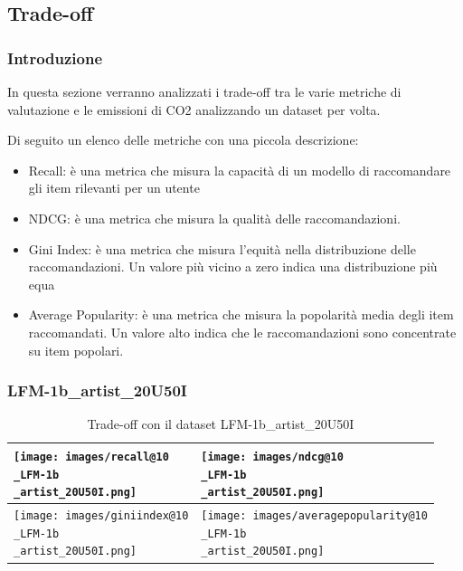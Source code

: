 \subsection{Trade-off}


\subsubsection{Introduzione}
In questa sezione verranno analizzati i trade-off tra le varie metriche di valutazione e le emissioni di CO2 analizzando un dataset per volta.

Di seguito un elenco delle metriche con una piccola descrizione:
\begin{itemize}
    \item Recall: è una metrica che misura la capacità di un modello di raccomandare gli item rilevanti per un utente
    \item NDCG: è una metrica che misura la qualità delle raccomandazioni.
    \item Gini Index: è una metrica che misura l'equità nella distribuzione delle raccomandazioni. Un valore più vicino a zero indica una distribuzione più equa
    \item Average Popularity: è una metrica che misura la popolarità media degli item raccomandati. Un valore alto indica che le raccomandazioni sono concentrate su item popolari.
\end{itemize}

\subsubsection{LFM-1b\_artist\_20U50I}


\begin{table}[H]
    \centering
    \footnotesize
    \setlength\tabcolsep{0pt}
    \begin{tabularx}{\textwidth}{|X|X|}
        \hline
        \texttt{[image: images/recall@10\\\_LFM-1b\\\_artist\_20U50I.png]} &
        \texttt{[image: images/ndcg@10\\\_LFM-1b\\\_artist\_20U50I.png]} \\
        \hline
        \texttt{[image: images/giniindex@10\\\_LFM-1b\\\_artist\_20U50I.png]} &
        \texttt{[image: images/averagepopularity@10\\\_LFM-1b\\\_artist\_20U50I.png]} \\
        \hline
    \end{tabularx}
    \caption{Trade-off con il dataset LFM-1b\_artist\_20U50I}
    \label{tab:emissions_info}
\end{table}

